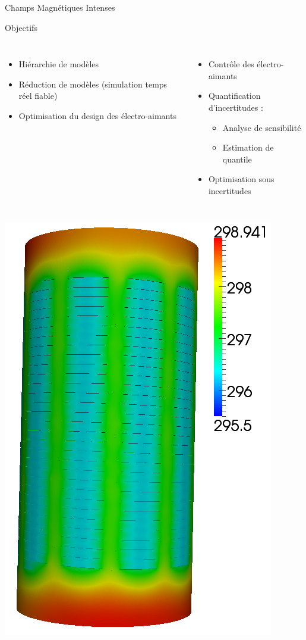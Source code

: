 \begin{frame}{Champs Magnétiques Intenses}
  \begin{block}{Objectifs}
    \begin{columns}[c]

      \begin{itemize}
      \item Hiérarchie de modèles
      \item Réduction de modèles (simulation temps réel fiable)
      \item Optimisation du design des électro-aimants
      \end{itemize}


      \begin{itemize}
      \item Contrôle  des électro-aimants
      \item Quantification d'incertitudes :
        \begin{itemize}
        \item Analyse de sensibilité
        \item Estimation de quantile
        \end{itemize}
      \item Optimisation sous incertitudes
      \end{itemize}
  \end{columns}
    \end{block}
    \begin{columns}[c]
      \includegraphics[height=.5\textheight]{Figures/cmi/temperature_HR_Bosse_1.png}

\end{columns}
\end{frame}

